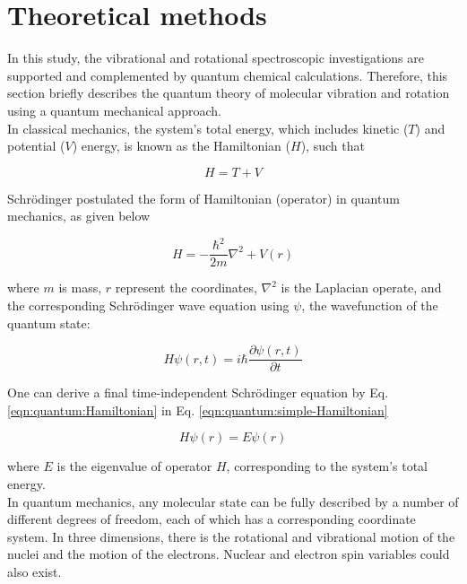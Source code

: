 \section{Theoretical methods}
\label{sec:theory}

In this study, the vibrational and rotational spectroscopic investigations are
supported and complemented by quantum chemical calculations. Therefore, this
section briefly describes the quantum theory of molecular vibration and
rotation using a quantum mechanical approach.\\

In classical mechanics, the system's total energy, which includes kinetic ($T$)
and potential ($V$) energy, is known as the Hamiltonian ($H$), such that

\begin{equation}
    \label{eqn:classical:Hamiltonian}
    H = T + V
\end{equation}

Schr\"odinger postulated the form of Hamiltonian (operator) in quantum
mechanics, as given below

\begin{equation}
    \label{eqn:quantum:Hamiltonian}
    H = - \frac{\hbar^2}{2m} \nabla^2 + V(r)
\end{equation}

where $m$ is mass, $r$ represent the coordinates, $\nabla^2$ is the Laplacian
operate, and the corresponding Schr\"odinger wave equation using $\psi$, the
wavefunction of the quantum state:

\begin{equation}
    \label{eqn:quantum:simple-Hamiltonian}
    H\psi(r, t) = i \hbar \frac{\partial \psi(r, t)}{\partial t}
\end{equation}

One can derive a final time-independent Schr\"odinger equation by 
Eq. \ref{eqn:quantum:Hamiltonian} in Eq. \ref{eqn:quantum:simple-Hamiltonian}

\begin{equation}
    \label{eqn:quantum:wave-eqn}
    H\psi(r) = E\psi(r)
\end{equation}

where $E$ is the eigenvalue of operator $H$, corresponding to the system's
total energy.\\

In quantum mechanics, any molecular state can be fully described by a number of
different degrees of freedom, each of which has a corresponding coordinate
system. In three dimensions, there is the rotational and vibrational motion of
the nuclei and the motion of the electrons. Nuclear and electron spin variables
could also exist.\\

